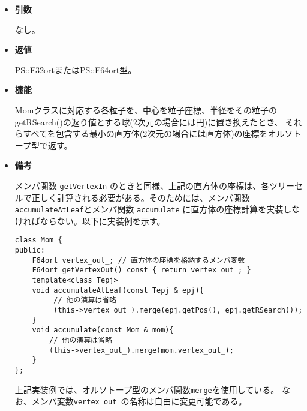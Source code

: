 \begin{itemize}

\item {\bf 引数}

  なし。
  
\item {\bf 返値}

  PS::F32ortまたはPS::F64ort型。

\item {\bf 機能}

Momクラスに対応する各粒子を、中心を粒子座標、半径をその粒子のgetRSearch()の返り値とする球(2次元の場合には円)に置き換えたとき、
それらすべてを包含する最小の直方体(2次元の場合には直方体)の座標をオルソトープ型で返す。

\item {\bf 備考}
  
メンバ関数 \texttt{getVertexIn} のときと同様、上記の直方体の座標は、各ツリーセルで正しく計算される必要がある。そのためには、メンバ関数\texttt{accumulateAtLeaf}とメンバ関数 \texttt{accumulate} に直方体の座標計算を実装しなければならない。以下に実装例を示す。 
  
\begin{screen}
\begin{verbatim}
class Mom {
public:
    F64ort vertex_out_; // 直方体の座標を格納するメンバ変数
    F64ort getVertexOut() const { return vertex_out_; }
    template<class Tepj>
    void accumulateAtLeaf(const Tepj & epj){ 
         // 他の演算は省略
         (this->vertex_out_).merge(epj.getPos(), epj.getRSearch());
    }
    void accumulate(const Mom & mom){
        // 他の演算は省略
        (this->vertex_out_).merge(mom.vertex_out_);
    }
};
\end{verbatim}
\end{screen}
上記実装例では、オルソトープ型のメンバ関数\texttt{merge}を使用している。
なお、メンバ変数\texttt{vertex\_out\_}の名称は自由に変更可能である。
  
\end{itemize}